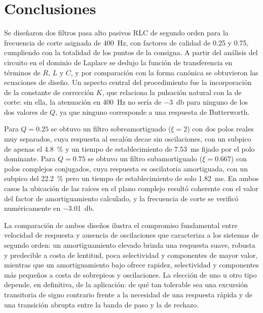 \chapter{Conclusiones}
Se diseñaron dos filtros pasa alto pasivos RLC de segundo orden para la frecuencia de corte asignada de
\qty{400}{\hertz}, con factores de calidad de \num{0.25} y \num{0.75}, cumpliendo con la totalidad de los
puntos de la consigna. A partir del análisis del circuito en el dominio de Laplace se dedujo la función de
transferencia en términos de $R$, $L$ y $C$, y por comparación con la forma canónica se obtuvieron las
ecuaciones de diseño. Un aspecto central del procedimiento fue la incorporación de la constante de
corrección $K$, que relaciona la pulsación natural con la de corte: sin ella, la atenuación en
\qty{400}{\hertz} no sería de \qty{-3}{\decibel} para ninguno de los dos valores de $Q$, ya que ninguno
corresponde a una respuesta de Butterworth.

Para $Q = \num{0.25}$ se obtuvo un filtro sobreamortiguado ($\xi = 2$) con dos polos reales muy separados,
cuya respuesta al escalón decae sin oscilaciones, con un subpico de apenas el \qty{4.8}{\percent} y un
tiempo de establecimiento de \qty{7.53}{\milli\second} fijado por el polo dominante. Para $Q = \num{0.75}$
se obtuvo un filtro subamortiguado ($\xi = \num{0.667}$) con polos complejos conjugados, cuya respuesta es
oscilatoria amortiguada, con un subpico del \qty{22.2}{\percent} pero un tiempo de establecimiento de solo
\qty{1.82}{\milli\second}. En ambos casos la ubicación de las raíces en el plano complejo resultó
coherente con el valor del factor de amortiguamiento calculado, y la frecuencia de corte se verificó
numéricamente en \qty{-3.01}{\decibel}.

La comparación de ambos diseños ilustra el compromiso fundamental entre velocidad de respuesta y ausencia
de oscilaciones que caracteriza a los sistemas de segundo orden: un amortiguamiento elevado brinda una
respuesta suave, robusta y predecible a costa de lentitud, poca selectividad y componentes de mayor valor,
mientras que un amortiguamiento bajo ofrece rapidez, selectividad y componentes más pequeños a costa de
sobrepicos y oscilaciones. La elección de uno u otro tipo depende, en definitiva, de la aplicación: de qué
tan tolerable sea una excursión transitoria de signo contrario frente a la necesidad de una respuesta
rápida y de una transición abrupta entre la banda de paso y la de rechazo.

